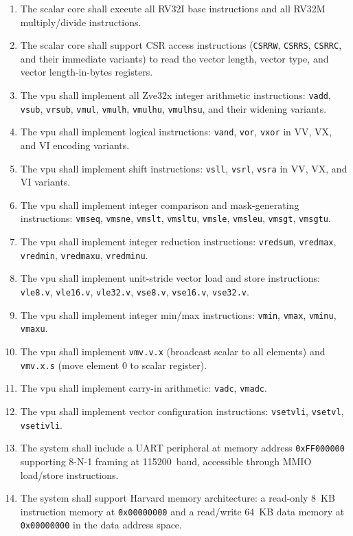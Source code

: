 \begin{enumerate}[label=FR-\arabic*.]
  \item The scalar core shall execute all RV32I base instructions and all RV32M
        multiply/divide instructions.
  \item The scalar core shall support CSR access instructions (\texttt{CSRRW},
        \texttt{CSRRS}, \texttt{CSRRC}, and their immediate variants) to read the
        vector length, vector type, and vector length-in-bytes registers.
  \item The \gls{vpu} shall implement all Zve32x integer arithmetic instructions:
        \texttt{vadd}, \texttt{vsub}, \texttt{vrsub}, \texttt{vmul}, \texttt{vmulh},
        \texttt{vmulhu}, \texttt{vmulhsu}, and their widening variants.
  \item The \gls{vpu} shall implement logical instructions: \texttt{vand}, \texttt{vor},
        \texttt{vxor} in VV, VX, and VI encoding variants.
  \item The \gls{vpu} shall implement shift instructions: \texttt{vsll}, \texttt{vsrl},
        \texttt{vsra} in VV, VX, and VI variants.
  \item The \gls{vpu} shall implement integer comparison and mask-generating instructions:
        \texttt{vmseq}, \texttt{vmsne}, \texttt{vmslt}, \texttt{vmsltu}, \texttt{vmsle},
        \texttt{vmsleu}, \texttt{vmsgt}, \texttt{vmsgtu}.
  \item The \gls{vpu} shall implement integer reduction instructions: \texttt{vredsum},
        \texttt{vredmax}, \texttt{vredmin}, \texttt{vredmaxu}, \texttt{vredminu}.
  \item The \gls{vpu} shall implement unit-stride vector load and store instructions:
        \texttt{vle8.v}, \texttt{vle16.v}, \texttt{vle32.v}, \texttt{vse8.v},
        \texttt{vse16.v}, \texttt{vse32.v}.
  \item The \gls{vpu} shall implement integer min/max instructions: \texttt{vmin},
        \texttt{vmax}, \texttt{vminu}, \texttt{vmaxu}.
  \item The \gls{vpu} shall implement \texttt{vmv.v.x} (broadcast scalar to all elements)
        and \texttt{vmv.x.s} (move element 0 to scalar register).
  \item The \gls{vpu} shall implement carry-in arithmetic: \texttt{vadc},
        \texttt{vmadc}.
  \item The \gls{vpu} shall implement vector configuration instructions:
        \texttt{vsetvli}, \texttt{vsetvl}, \texttt{vsetivli}.
  \item The system shall include a UART peripheral at memory address \texttt{0xFF000000}
        supporting 8-N-1 framing at 115200~baud, accessible through MMIO load/store
        instructions.
  \item The system shall support Harvard memory architecture: a read-only 8~KB
        instruction memory at \texttt{0x00000000} and a read/write 64~KB data memory
        at \texttt{0x00000000} in the data address space.
\end{enumerate}

